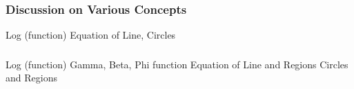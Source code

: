 \documentclass[compress]{beamer}
\newcommand{\sqBullet}[1]{  {\tiny \tiny \tiny \qBoxCol{#1!60}{ }} }
\begin{document}
\begin{frame}\frametitle{Discussion on Various Concepts}
{\tiny Log (function)
Equation of Line,  Circles 
}
\vspace{3in}
\end{frame}




\begin{frame}\frametitle{}
{\tiny Log (function)
Gamma, Beta, Phi function
Equation of Line and Regions
Circles and Regions
}
\vspace{3in}
\end{frame}


%
%
%	
%	
%			
%







 
 
\end{document}
